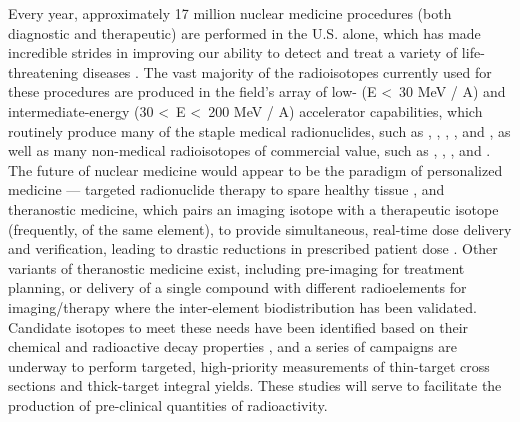 \documentclass[3p]{elsarticle}
\newcommand{\comment}[1]{\todo[color=blue!20!white,inline]{ASV: #1}}
\begin{document}
Every year, approximately 17 million nuclear medicine procedures (both diagnostic and therapeutic) are performed in the U.S. alone,  which has made incredible strides in improving our ability to detect and treat a variety of life-threatening diseases \cite{Delbeke2011,NSACIsotopesSubcommittee2015}.
The vast majority of the radioisotopes currently used for these procedures are produced in the field's array of low- (E \textless\ 30 MeV / A) and intermediate-energy (30 \textless\ E \textless\ 200 MeV / A) accelerator capabilities, which routinely produce many of the staple medical radionuclides, such as , , , , and , as well as many  
non-medical radioisotopes of commercial value, such as  , , , and   \cite{international2009iaea,schlyer2008cyclotron}. 
The future of nuclear medicine would appear to be the paradigm of personalized medicine --- targeted radionuclide therapy to spare healthy tissue \cite{Mulford2005,Qaim201731}, and theranostic medicine, which pairs an imaging isotope with a therapeutic isotope (frequently, of the same element), to provide simultaneous, real-time dose delivery and verification, leading to drastic reductions in prescribed patient dose \cite{Muller2014,Bentzen2005,Srivastava2012}. 
Other variants of theranostic medicine exist, including pre-imaging for treatment planning, or delivery of a single compound with different radioelements for imaging/therapy where the inter-element biodistribution has been validated.  
Candidate isotopes to meet these needs have been identified based on their chemical and radioactive decay properties \cite{NSACIsotopesSubcommittee2015,Qaim201731,bernstein2015nuclear}, and a series of campaigns are underway to perform targeted, high-priority measurements of thin-target cross sections and thick-target integral yields.
These studies will serve to facilitate the production of pre-clinical quantities of radioactivity.
\end{document}

